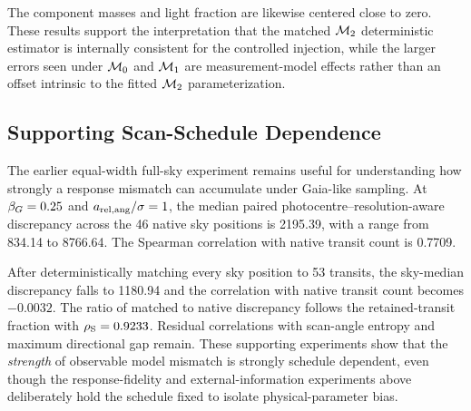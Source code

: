 The component masses and light fraction are likewise centered close to zero. These results support the interpretation that the matched $\mathcal{M}_2$ deterministic estimator is internally consistent for the controlled injection, while the larger errors seen under $\mathcal{M}_0$ and $\mathcal{M}_1$ are measurement-model effects rather than an offset intrinsic to the fitted $\mathcal{M}_2$ parameterization.

\subsection{Supporting Scan-Schedule Dependence}

The earlier equal-width full-sky experiment remains useful for understanding how strongly a response mismatch can accumulate under Gaia-like sampling. At $\beta_G=0.25$ and $a_{\rm rel,ang}/\sigma=1$, the median paired photocentre--resolution-aware discrepancy across the 46 native sky positions is 2195.39, with a range from 834.14 to 8766.64. The Spearman correlation with native transit count is 0.7709.

After deterministically matching every sky position to 53 transits, the sky-median discrepancy falls to 1180.94 and the correlation with native transit count becomes $-0.0032$. The ratio of matched to native discrepancy follows the retained-transit fraction with $\rho_{\rm S}=0.9233$. Residual correlations with scan-angle entropy and maximum directional gap remain. These supporting experiments show that the \emph{strength} of observable model mismatch is strongly schedule dependent, even though the response-fidelity and external-information experiments above deliberately hold the schedule fixed to isolate physical-parameter bias.
